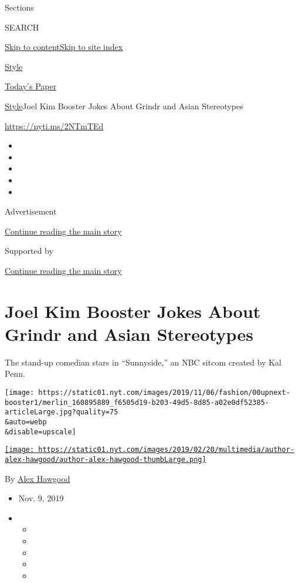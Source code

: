 Sections

SEARCH

\protect\hyperlink{site-content}{Skip to
content}\protect\hyperlink{site-index}{Skip to site index}

\href{https://www.nytimes.com/section/style}{Style}

\href{https://myaccount.nytimes.com/auth/login?response_type=cookie\&client_id=vi}{}

\href{https://www.nytimes.com/section/todayspaper}{Today's Paper}

\href{/section/style}{Style}\textbar{}Joel Kim Booster Jokes About
Grindr and Asian Stereotypes

\href{https://nyti.ms/2NTmTEd}{https://nyti.ms/2NTmTEd}

\begin{itemize}
\item
\item
\item
\item
\item
\end{itemize}

Advertisement

\protect\hyperlink{after-top}{Continue reading the main story}

Supported by

\protect\hyperlink{after-sponsor}{Continue reading the main story}

\hypertarget{joel-kim-booster-jokes-about-grindr-and-asian-stereotypes}{%
\section{Joel Kim Booster Jokes About Grindr and Asian
Stereotypes}\label{joel-kim-booster-jokes-about-grindr-and-asian-stereotypes}}

The stand-up comedian stars in ``Sunnyside,'' an NBC sitcom created by
Kal Penn.

\texttt{[image: https://static01.nyt.com/images/2019/11/06/fashion/00upnext-booster1/merlin\_160895889\_f6505d19-b203-49d5-8d85-a02e0df52385-articleLarge.jpg?quality=75\\\&auto=webp\\\&disable=upscale]}

\href{https://www.nytimes.com/by/alex-hawgood}{\texttt{[image: https://static01.nyt.com/images/2019/02/20/multimedia/author-alex-hawgood/author-alex-hawgood-thumbLarge.png]}}

By \href{https://www.nytimes.com/by/alex-hawgood}{Alex Hawgood}

\begin{itemize}
\item
  Nov. 9, 2019
\item
  \begin{itemize}
  \item
  \item
  \item
  \item
  \item
  \end{itemize}
\end{itemize}

